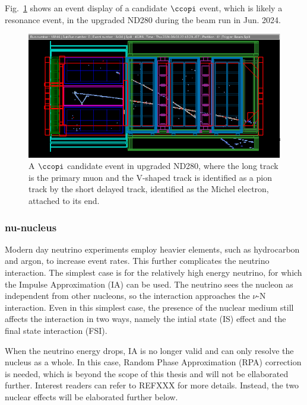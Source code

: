   Fig.~\ref{fig:cc1pi} shows an event display of a candidate $\ccopi$ event, which is likely a resonance event, in the upgraded ND280 during the beam run in Jun. 2024.
  \begin{figure}[!htb] 	
      \centering 		
      \includegraphics[width=\sgfigwid\textwidth]{figures/shortME.png}
      \caption{\label{fig:cc1pi} A $\ccopi$ candidate event in upgraded ND280, where the long track is the primary muon and the V-shaped track is identified as a pion track by the short delayed track, identified as the Michel electron, attached to its end.} 
  \end{figure}

\subsubsection{nu-nucleus}
Modern day neutrino experiments employ heavier elements, such as hydrocarbon and argon, to increase event rates.
This further complicates the neutrino interaction.
The simplest case is for the relatively high energy neutrino, for which the Impulse Approximation (IA) can be used.
The neutrino sees the nucleon as independent from other nucleons, so the interaction approaches the $\nu$-N interaction.
Even in this simplest case, the presence of the nuclear medium still affects the interaction in two ways, namely the intial state (IS) effect and the final state interaction (FSI).

When the neutrino energy drops, IA is no longer valid and can only resolve the nucleus as a whole.
In this case, Random Phase Approximation (RPA) correction is needed, which is beyond the scope of this thesis and will not be ellaborated further. 
Interest readers can refer to REFXXX for more details.
Instead, the two nuclear effects will be elaborated further below.

